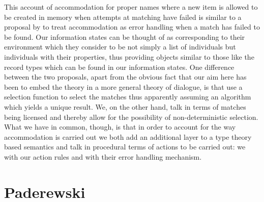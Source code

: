 This account of accommodation for proper names where a new item is
allowed to be created in memory when attempts at matching have failed
is similar to a proposal by \cite{GrooteLebedeva2010} to treat
accommodation as error handling when a match has failed to be found.
Our information states can be thought of as corresponding to their
environment which they consider to be not simply a list of individuals
but individuals with their properties, thus providing objects similar
to those like the record types which can be found in our information
states.  One difference between the two proposals, apart from the
obvious fact that our aim here has been to embed the theory in a more
general theory of dialogue, is that
\citeauthor{GrooteLebedeva2010} use a selection function to select the
matches thus apparently assuming an algorithm which yields a unique
result.  We, on the other hand, talk in terms of matches being licensed
and thereby allow for the possibility of non-deterministic
selection. What we have in common, though, is that in order to account
for the way accommodation is carried out we both add an additional
layer to a type
theory based  semantics and talk in procedural terms of
actions to be carried out:  we with our action rules and \citeauthor{GrooteLebedeva2010} with their error handling mechanism.
     
\section{Paderewski}
\label{sec:Paderewski}

